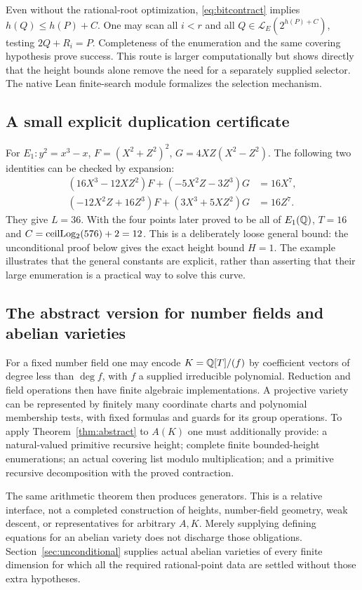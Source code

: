 Even without the rational-root optimization, \eqref{eq:bitcontract}
implies $h(Q)\le h(P)+C$. One may scan all $i<r$ and all
$Q\in\mathcal L_E(2^{h(P)+C})$, testing $2Q+R_i=P$.
Completeness of the enumeration and the same covering hypothesis prove
success. This route is larger computationally but shows directly that
the height bounds alone remove the need for a separately supplied selector.
The native Lean finite-search module formalizes the selection mechanism.

\subsection{A small explicit duplication certificate}

For $E_1:y^2=x^3-x$,
$F=(X^2+Z^2)^2$, $G=4XZ(X^2-Z^2)$. The following two identities
can be checked by expansion:
\[
\begin{split}
 (16X^3-12XZ^2)F+(-5X^2Z-3Z^3)G&=16X^7,\\
 (-12X^2Z+16Z^3)F+(3X^3+5XZ^2)G&=16Z^7.
\end{split}
\tag{5.6}
\]
They give $L=36$. With the four points later proved to be all of $E_1(\mathbb Q)$,
$T=16$ and $C=\operatorname{ceilLog_2}(576)+2=12$. This is a deliberately loose general
bound: the unconditional proof below gives the exact height bound $H=1$.
The example illustrates that the general constants are explicit, rather
than asserting that their large enumeration is a practical way to solve
this curve.

\subsection{The abstract version for number fields and abelian varieties}

For a fixed number field one may encode $K=\mathbb Q[T]/(f)$ by coefficient
vectors of degree less than $\deg f$, with $f$ a supplied irreducible
polynomial. Reduction and field operations then have finite algebraic
implementations. A projective variety can be represented by finitely many
coordinate charts and polynomial membership tests, with fixed formulas
and guards for its group operations. To apply
Theorem~\ref{thm:abstract} to $A(K)$ one must additionally provide:
a natural-valued primitive recursive height; complete finite
bounded-height enumerations; an actual covering list modulo multiplication;
and a primitive recursive decomposition with the proved contraction.

The same arithmetic theorem then produces generators. This is a
relative interface, not a completed construction of heights,
number-field geometry, weak descent, or representatives for arbitrary
$A,K$. Merely supplying defining equations for an abelian variety does
not discharge those obligations. Section~\ref{sec:unconditional} supplies
actual abelian varieties of every finite dimension for which all the
required rational-point data are settled without those extra hypotheses.
